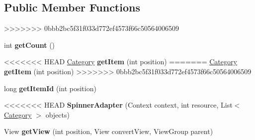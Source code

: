 \subsection*{\-Public \-Member \-Functions}
>>>>>>> 0bbb2bc5f31f033d772ef4573f66c50564006509
\begin{DoxyCompactItemize}
\item 
\hypertarget{classcom_1_1example_1_1sel_1_1lostfound_1_1SpinnerAdapter_a9ee3f8a3ee4642cc4379a4fc710a4484}{int {\bfseries get\-Count} ()}\label{classcom_1_1example_1_1sel_1_1lostfound_1_1SpinnerAdapter_a9ee3f8a3ee4642cc4379a4fc710a4484}

\item 
<<<<<<< HEAD
\hypertarget{classcom_1_1example_1_1sel_1_1lostfound_1_1SpinnerAdapter_a48949a737b70991a11fe5f45e6c0b6c1}{\hyperlink{classcom_1_1example_1_1sel_1_1lostfound_1_1Category}{Category} {\bfseries get\-Item} (int position)}\label{classcom_1_1example_1_1sel_1_1lostfound_1_1SpinnerAdapter_a48949a737b70991a11fe5f45e6c0b6c1}
=======
\hypertarget{classcom_1_1example_1_1sel_1_1lostfound_1_1SpinnerAdapter_a48949a737b70991a11fe5f45e6c0b6c1}{\hyperlink{classcom_1_1example_1_1sel_1_1lostfound_1_1Category}{\-Category} {\bfseries get\-Item} (int position)}\label{classcom_1_1example_1_1sel_1_1lostfound_1_1SpinnerAdapter_a48949a737b70991a11fe5f45e6c0b6c1}
>>>>>>> 0bbb2bc5f31f033d772ef4573f66c50564006509

\item 
\hypertarget{classcom_1_1example_1_1sel_1_1lostfound_1_1SpinnerAdapter_a248484bdf819294d3bdc8f6db635c673}{long {\bfseries get\-Item\-Id} (int position)}\label{classcom_1_1example_1_1sel_1_1lostfound_1_1SpinnerAdapter_a248484bdf819294d3bdc8f6db635c673}

\item 
<<<<<<< HEAD
\hypertarget{classcom_1_1example_1_1sel_1_1lostfound_1_1SpinnerAdapter_a9cbc724bbe142a941090cc9bf5b8bcb6}{{\bfseries Spinner\-Adapter} (Context context, int resource, List$<$ \hyperlink{classcom_1_1example_1_1sel_1_1lostfound_1_1Category}{Category} $>$ objects)}\label{classcom_1_1example_1_1sel_1_1lostfound_1_1SpinnerAdapter_a9cbc724bbe142a941090cc9bf5b8bcb6}

\item 
\hypertarget{classcom_1_1example_1_1sel_1_1lostfound_1_1SpinnerAdapter_ac19132459aeaef196c367a156bb03e0e}{View {\bfseries get\-View} (int position, View convert\-View, View\-Group parent)}\label{classcom_1_1example_1_1sel_1_1lostfound_1_1SpinnerAdapter_ac19132459aeaef196c367a156bb03e0e}


\end{DoxyCompactItemize}
